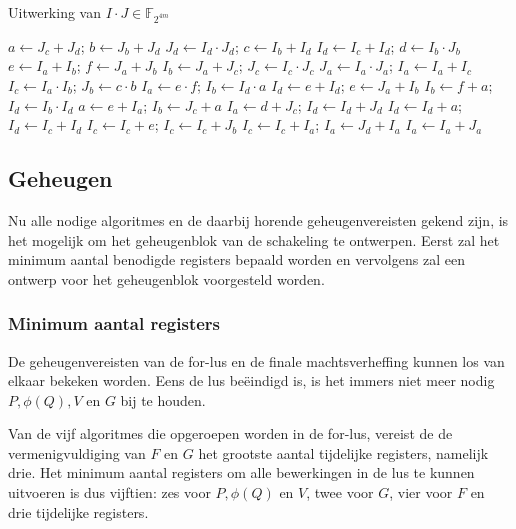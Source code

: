 \begin{algorithm}
	\caption{Uitwerking van $I \cdot J \in \mathbb{F}_{2^{4m}}$}
	\label{algoritme-implementatie-miller-f4m-mult}
	$a \gets J_c + J_d$; $b \gets J_b + J_d$\;
	$J_d \gets I_d \cdot J_d$; $c \gets I_b + I_d$\;
	$I_d \gets I_c + I_d$; $d \gets I_b \cdot J_b$\;
	$e \gets I_a + I_b$; $f \gets J_a + J_b$\;
	$I_b \gets J_a + J_c$; $J_c \gets I_c \cdot J_c$\;
	$J_a \gets I_a \cdot J_a$; $I_a \gets I_a + I_c$\;
	$I_c \gets I_a \cdot I_b$; $J_b \gets c \cdot b$\;
	$I_a \gets e \cdot f$; $I_b \gets I_d \cdot a$ \;
	$I_d \gets e + I_d$; $e \gets J_a + I_b$\;
	$I_b \gets f + a$; $I_d \gets I_b \cdot I_d$\;
	$a \gets e + I_a$; $I_b \gets J_c + a$\;
	$I_a \gets d + J_c$; $I_d \gets I_d + J_d$\;
	$I_d \gets I_d + a$; $I_d \gets I_c + I_d$\;
	$I_c \gets I_c + e$; $I_c \gets I_c + J_b$\;
	$I_c \gets I_c + I_a$; $I_a \gets J_d + I_a$\;
	$I_a \gets I_a + J_a$\;
\end{algorithm}

\subsection{Geheugen}

Nu alle nodige algoritmes en de daarbij horende geheugenvereisten gekend zijn, is het mogelijk om het geheugenblok van de schakeling te ontwerpen. Eerst zal het minimum aantal benodigde registers bepaald worden en vervolgens zal een ontwerp voor het geheugenblok voorgesteld worden.

\subsubsection{Minimum aantal registers}

De geheugenvereisten van de for-lus en de finale machtsverheffing kunnen los van elkaar bekeken worden. Eens de lus be\"eindigd is, is het immers niet meer nodig $P, \phi(Q), V$ en $G$ bij te houden.

Van de vijf algoritmes die opgeroepen worden in de for-lus, vereist de de vermenigvuldiging van $F$ en $G$ het grootste aantal tijdelijke registers, namelijk drie. Het minimum aantal registers om alle bewerkingen in de lus te kunnen uitvoeren is dus vijftien: zes voor $P, \phi(Q)$ en $V$, twee voor $G$, vier voor $F$ en drie tijdelijke registers.

